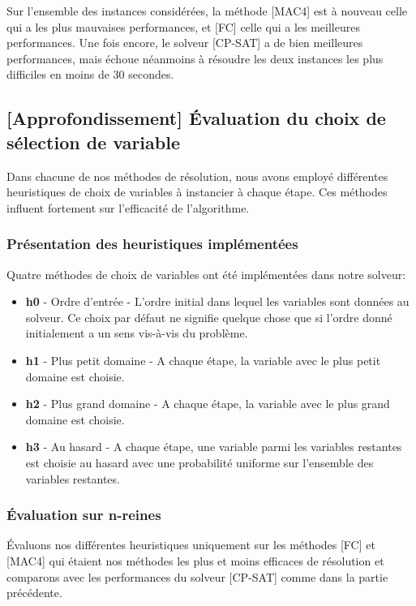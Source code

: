 \documentclass[14pt]{article}
\begin{document}
Sur l'ensemble des instances considérées, la méthode [MAC4] est à nouveau celle qui a les plus mauvaises performances, et [FC] celle qui a les meilleures performances. Une fois encore, le solveur [CP-SAT] a de bien meilleures performances, mais échoue néanmoins à résoudre les deux instances les plus difficiles en moins de 30 secondes.

\subsection{[Approfondissement] Évaluation du choix de sélection de variable}

Dans chacune de nos méthodes de résolution, nous avons employé différentes heuristiques de choix de variables à instancier à chaque étape. Ces méthodes influent fortement sur l'efficacité de l'algorithme.

\subsubsection{Présentation des heuristiques implémentées}

Quatre méthodes de choix de variables ont été implémentées dans notre solveur:
\begin{itemize}
	\item \textbf{h0} - Ordre d'entrée - L'ordre initial dans lequel les variables sont données au solveur. Ce choix par défaut ne signifie quelque chose que si l'ordre donné initialement a un sens vis-à-vis du problème.
	\item \textbf{h1} - Plus petit domaine - A chaque étape, la variable avec le plus petit domaine est choisie.
	\item \textbf{h2} - Plus grand domaine - A chaque étape, la variable avec le plus grand domaine est choisie.
	\item \textbf{h3} - Au hasard - A chaque étape, une variable parmi les variables restantes est choisie au hasard avec une probabilité uniforme sur l'ensemble des variables restantes.
\end{itemize}


\subsubsection{Évaluation sur n-reines}

Évaluons nos différentes heuristiques uniquement sur les méthodes [FC] et [MAC4] qui étaient nos méthodes les plus et moins efficaces de résolution et comparons avec les performances du solveur [CP-SAT] comme dans la partie précédente.
\end{document}
